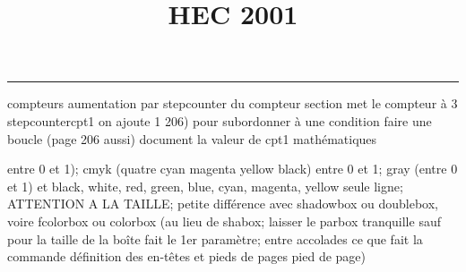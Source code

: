 \documentclass[11pt]{article}%
\title{\bf \vspace{-1cm} HEC 2001} %
\author{} %
\date{} %
\renewcommand{\headrulewidth}{0pt}%
\renewcommand{\footrulewidth}{0.4pt}%
\begin{document}
\maketitle %
\vspace{-1.2cm}\hrule %
\thispagestyle{fancy}

\vspace*{.4cm}


compteurs%
aumentation par stepcounter du compteur section%
met le compteur à 3%
stepcounter{cpt1} on ajoute 1%
206) pour subordonner à une condition %
faire une boucle (page 206 aussi) %
document la valeur de cpt1 
mathématiques\newcommand{\ch}{\operatorname{ch}} 
\newcommand{\sh}{\operatorname{sh}}
\renewcommand{\tanh}{\operatorname{th}}
\renewcommand{\sinh}{\operatorname{sh}}
\renewcommand{\cosh}{\operatorname{ch}}
\newcommand{\argsh}{\operatorname{argsh}}
\newcommand{\argch}{\operatorname{argch}}
\newcommand{\argth}{\operatorname{argth}}
\newcommand{\Id}{\operatorname{Id}}
\renewcommand{\leq}{\leq}
\renewcommand{\geq}{\geq }

\newcommand{\dlim}{\lim}
\newcommand{\dsum}{\sum}
\newcommand{\dprod}{\prod}



entre 0 et 1); cmyk (quatre cyan magenta yellow black) entre 0 et 1;
gray (entre 0 et 1) et black, white, red, green, blue, cyan, magenta,
yellow%
seule ligne; ATTENTION A LA TAILLE; petite différence avec shadowbox ou
doublebox, voire fcolorbox ou colorbox (au lieu de shabox; laisser le
parbox tranquille sauf pour la taille de la boîte
\newcommand{\Tbox}[1]{\begin{center} \shabox{\parbox{0.6
\linewidth}{#1}} \end{center}} %
fait le 1er paramètre; entre accolades ce que fait la commande
définition des en-têtes et pieds de pages\pagestyle{fancy}
\chead{}
\rfoot[ \ \thepage]{\thepage}
\cfoot{}
\lfoot{}
\thispagestyle{fancy} %
pied de page)\renewcommand{\footrulewidth}{0.4pt}
\renewcommand{\headrulewidth}{0.4pt}
\end{document}
